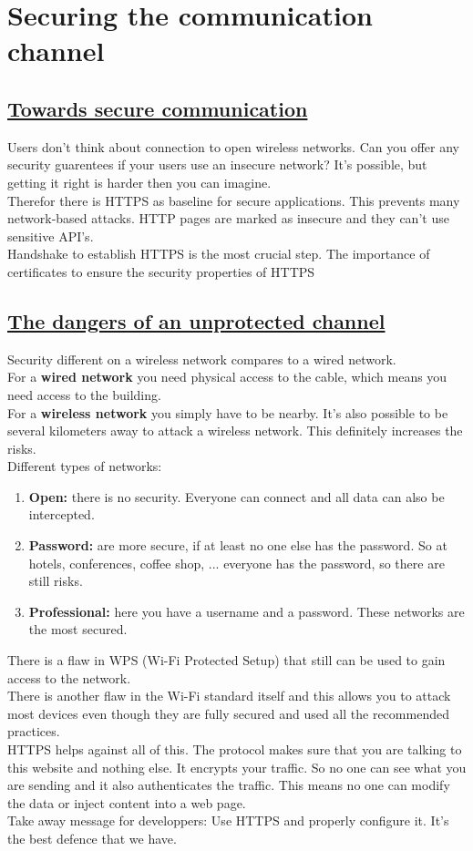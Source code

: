 \documentclass[titlepage]{article}
\begin{document}
    \section{Securing the communication channel}
    \subsection{\href{https://youtu.be/QFxUan870DY}{Towards secure communication}}
    Users don't think about connection to open wireless networks. Can you offer any security guarentees if your users use an insecure network? It's possible, but getting it right is harder then you can imagine.\\
    Therefor there is HTTPS as baseline for secure applications. This prevents many network-based attacks. HTTP pages are marked as insecure and they can't use sensitive API's.\\
    Handshake to establish HTTPS is the most crucial step. The importance of certificates to ensure the security properties of HTTPS
    \subsection{\href{https://youtu.be/FIXOdASmMVI}{The dangers of an unprotected channel}}
    Security different on a wireless network compares to a wired network.\\
    For a \textbf{wired network} you need physical access to the cable, which means you need access to the building. \\
    For a \textbf{wireless network} you simply have to be nearby. It's also possible to be several kilometers away to attack a wireless network. This definitely increases the risks.\\
    Different types of networks:
    \begin{enumerate}
        \item \textbf{Open:} there is no security. Everyone can connect and all data can also be intercepted.
        \item \textbf{Password:} are more secure, if at least no one else has the password. So at hotels, conferences, coffee shop, ... everyone has the password, so there are still risks.
        \item \textbf{Professional:} here you have a username and a password. These networks are the most secured.
    \end{enumerate}
    There is a flaw in WPS (Wi-Fi Protected Setup) that still can be used to gain access to the network.\\
    There is another flaw in the Wi-Fi standard itself and this allows you to attack most devices even though they are fully secured and used all the recommended practices.\\
    HTTPS helps against all of this. The protocol makes sure that you are talking to this website and nothing else. It encrypts your traffic. So no one can see what you are sending and it also authenticates the traffic. This means no one can modify the data or inject content into a web page.\\
    Take away message for developpers: Use HTTPS and properly configure it. It's the best defence that we have.
\end{document}
